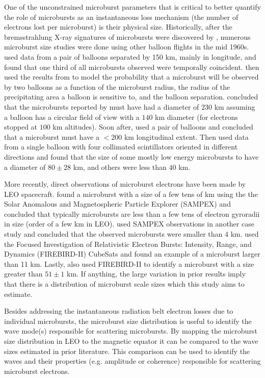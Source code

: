 \documentclass[draft]{agujournal2019}
\begin{document}
One of the unconstrained microburst parameters that is critical to better quantify the role of microbursts as an instantaneous loss mechanism (the number of electrons lost per microburst) is their physical size. Historically, after the bremsstrahlung X-ray signatures of microbursts were discovered by , numerous microburst size studies were done using other balloon flights in the mid 1960s.  used data from a pair of balloons separated by 150 km, mainly in longitude, and found that one third of all microbursts observed were temporally coincident.  then used the results from  to model the probability that a microburst will be observed by two balloons as a function of the microburst radius, the radius of the precipitating area a balloon is sensitive to, and the balloon separation.  concluded that the microbursts reported by   must have had a diameter of $230$ km assuming a balloon has a circular field of view with a $140$ km diameter (for electrons stopped at $100$ km altitudes). Soon after,  used a pair of balloons and concluded that a microburst must have a $<200$ km longitudinal extent. Then  used data from a single balloon with four collimated scintillators oriented in different directions and found that the size of some mostly low energy microbursts to have a diameter of $80 \pm 28$ km, and others were less than $40$ km. 

More recently, direct observations of microburst electrons have been made by LEO spacecraft.  found a microburst with a size of a few tens of km using the the Solar Anomalous and Magnetospheric Particle Explorer (SAMPEX) and concluded that typically microbursts are less than a few tens of electron gyroradii in size (order of a few km in LEO).  used SAMPEX observations in another case study and concluded that the observed microbursts were smaller than $4$ km.  used the Focused Investigation of Relativistic Electron Bursts: Intensity, Range, and Dynamics (FIREBIRD-II) CubeSats and found an example of a microburst larger than 11 km. Lastly,  also used FIREBIRD-II to identify a microburst with a size greater than $ 51 \pm 1$ km. If anything, the large variation in prior results imply that there is a distribution of microburst scale sizes which this study aims to estimate.

Besides addressing the instantaneous radiation belt electron losses due to individual microbursts, the microburst size distribution is useful to identify the wave mode(s) responsible for scattering microbursts. By mapping the microburst size distribution in LEO to the magnetic equator it can be compared to the wave sizes estimated in prior literature. This comparison can be used to identify the waves and their properties (e.g. amplitude or coherence) responsible for scattering microburst electrons.
\end{document}
